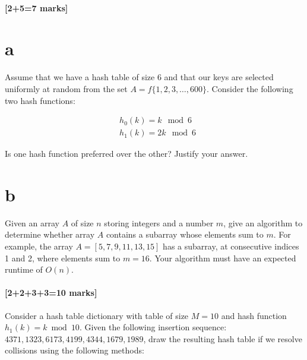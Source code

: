 \documentclass[12pt]{article}
\begin{document}
	\subsection{[2+5=7 marks]}
	
	\begin{enumerate}
		\part{a} Assume that we have a hash table of size 6 and that our keys are selected uniformly at random from the set $A = f\{1, 2, 3, \ldots, 600\}$. Consider the following two hash functions:
		\begin{center}
			$$\begin{aligned}
				& h_0(k) = k \mod 6 \\
				& h_1(k) = 2k \mod 6 
			\end{aligned}$$
		\end{center}
		
		Is one hash function preferred over the other? Justify your answer.
		
		\part{b} Given an array $A$ of size $n$ storing integers and a number $m$, give an algorithm to determine whether array $A$ contains a subarray whose elements sum to $m$.  
		For example, the array $A = [5, 7, 9, 11, 13, 15]$ has a subarray, at consecutive indices 1 and 2, where elements sum to $m=16$.
		Your algorithm must have an expected runtime of $O(n)$.
		
	\end{enumerate}
	
	\subsection{[2+2+3+3=10 marks]}
	
	Consider a hash table dictionary with table of size $M = 10$ and hash function $h_1(k) = k \bmod 10$. 
	Given the following insertion sequence: $4371, 1323, 6173, 4199, 4344, 1679, 1989$, 
	draw the resulting hash table if we resolve collisions using the following methods:
	
\end{document}
